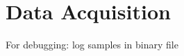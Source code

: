 \section{Data Acquisition}
\label{sec:03_dataAcquisition}

For debugging: log samples in binary file

